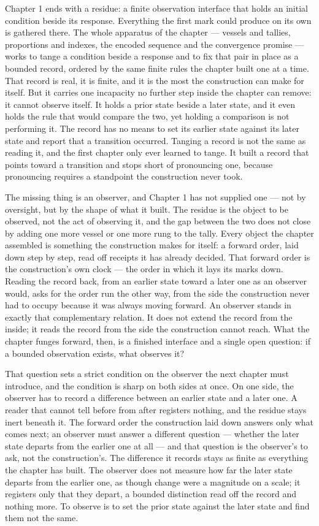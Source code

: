 Chapter 1 ends with a residue: a finite observation interface that holds an initial condition beside its response. Everything the first mark could produce on its own is gathered there. The whole apparatus of the chapter --- vessels and tallies, proportions and indexes, the encoded sequence and the convergence promise --- works to tange a condition beside a response and to fix that pair in place as a bounded record, ordered by the same finite rules the chapter built one at a time. That record is real, it is finite, and it is the most the construction can make for itself. But it carries one incapacity no further step inside the chapter can remove: it cannot observe itself. It holds a prior state beside a later state, and it even holds the rule that would compare the two, yet holding a comparison is not performing it. The record has no means to set its earlier state against its later state and report that a transition occurred. Tanging a record is not the same as reading it, and the first chapter only ever learned to tange. It built a record that points toward a transition and stops short of pronouncing one, because pronouncing requires a standpoint the construction never took.

The missing thing is an observer, and Chapter 1 has not supplied one --- not by oversight, but by the shape of what it built. The residue is the object to be observed, not the act of observing it, and the gap between the two does not close by adding one more vessel or one more rung to the tally. Every object the chapter assembled is something the construction makes for itself: a forward order, laid down step by step, read off receipts it has already decided. That forward order is the construction's own clock --- the order in which it lays its marks down. Reading the record back, from an earlier state toward a later one as an observer would, asks for the order run the other way, from the side the construction never had to occupy because it was always moving forward. An observer stands in exactly that complementary relation. It does not extend the record from the inside; it reads the record from the side the construction cannot reach. What the chapter funges forward, then, is a finished interface and a single open question: if a bounded observation exists, what observes it?

That question sets a strict condition on the observer the next chapter must introduce, and the condition is sharp on both sides at once. On one side, the observer has to record a difference between an earlier state and a later one. A reader that cannot tell before from after registers nothing, and the residue stays inert beneath it. The forward order the construction laid down answers only what comes next; an observer must answer a different question --- whether the later state departs from the earlier one at all --- and that question is the observer's to ask, not the construction's. The difference it records stays as finite as everything the chapter has built. The observer does not measure how far the later state departs from the earlier one, as though change were a magnitude on a scale; it registers only that they depart, a bounded distinction read off the record and nothing more. To observe is to set the prior state against the later state and find them not the same.

